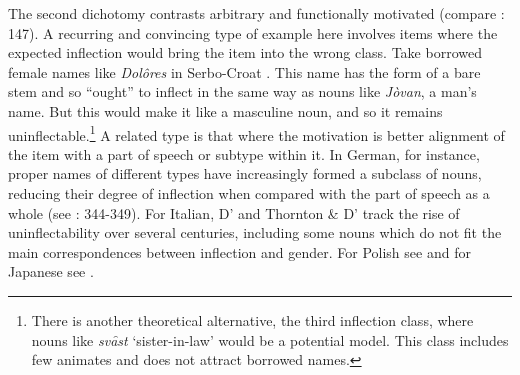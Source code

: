 \documentclass[output=paper]{langscibook}
\begin{document}
The second dichotomy contrasts arbitrary and functionally motivated (compare \citealt{Spencer2020}: 147). A recurring and convincing type of example here involves items where the expected inflection would bring the item into the wrong class. Take borrowed female names like \textit{Dolôres} in Serbo-Croat \citep[378]{Browne1993a}. This name has the form of a bare stem and so “ought” to inflect in the same way as nouns like \textit{Jòvan}, a man’s name. But this would make it like a masculine noun, and so it remains uninflectable.\footnote{ \textrm{There is another theoretical alternative, the third inflection class, where nouns like} \textrm{\textit{svȃst} }\textrm{‘sister-in-law’ would be a potential model. This class includes few animates and does not attract borrowed names.} } A related type is that where the motivation is better alignment of the item with a part of speech or subtype within it. In German, for instance, proper names of different types have increasingly formed a subclass of nouns, reducing their degree of inflection when compared with the part of speech as a whole (see \citealt{Nübling2017}: 344-349). For Italian, D’\citet{AchilleThornton2003} and Thornton \& D’\citet{Achille2025} track the rise of uninflectability over several centuries, including some nouns which do not fit the main correspondences between inflection and gender. For Polish see \citet{Gaszewski2025} and for Japanese see \citet{Köhlich2025}.
\end{document}
